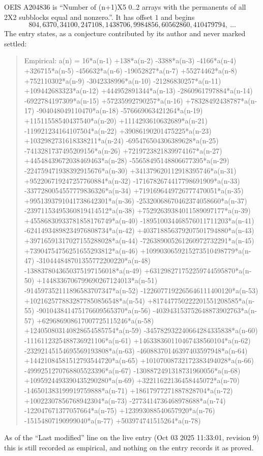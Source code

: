 \documentclass[11pt,a4paper]{article}
\theoremstyle{plain}
\theoremstyle{definition}
\begin{document}
OEIS A204836 is ``Number of (n+1)X5 0..2 arrays with the permanents of all 2X2 subblocks equal and nonzero.''. It has offset $1$ and begins
\[
804, 6370, 34100, 247108, 1438706, 9984856, 60562860, 410479794,\ \dots
\]
The entry states, as a conjecture contributed by its author and never marked settled:
\begin{quote}
Empirical: a(n) = 16*a(n-1) +138*a(n-2) -3388*a(n-3) -4166*a(n-4) +326715*a(n-5) -456632*a(n-6) -19052827*a(n-7) +55274462*a(n-8) +752110302*a(n-9) -3042338996*a(n-10) -21286830257*a(n-11) +109442683323*a(n-12) +444952891344*a(n-13) -2860961797884*a(n-14) -6922784197309*a(n-15) +57235992790257*a(n-16) +78328492438787*a(n-17) -904048049110470*a(n-18) -576669063421264*a(n-19) +11511558540437540*a(n-20) +1114293610632689*a(n-21) -119921234164107504*a(n-22) +39086190201475225*a(n-23) +1032982731618338211*a(n-24) -695476504306389628*a(n-25) -7413281737495209156*a(n-26) +7219723821839974167*a(n-27) +44548439672038469463*a(n-28) -55658495148806677395*a(n-29) -224759471938392915676*a(n-30) +341379620112918395746*a(n-31) +952206719247257760884*a(n-32) -1716782674417798691909*a(n-33) -3377280054557779836326*a(n-34) +7191696449726777470051*a(n-35) +9951393791041738642301*a(n-36) -25320068670462374058660*a(n-37) -23971153495360819414512*a(n-38) +75292639384011589097177*a(n-39) +45586830933781858176749*a(n-40) -189510034468576011711203*a(n-41) -62414934898234976808734*a(n-42) +403718856379207501794880*a(n-43) +39716591317027155288028*a(n-44) -726389005261260972732291*a(n-45) +73904754756251655293812*a(n-46) +1099030659215273510498779*a(n-47) -310444848701355772200220*a(n-48) -1388378043650375197156018*a(n-49) +631298271752259744595870*a(n-50) +1448336706799690267124013*a(n-51) -914597352111896583707347*a(n-52) -1226077192265646111400120*a(n-53) +1021625778832877850856548*a(n-54) +817447750222201551208585*a(n-55) -901043841475176609565370*a(n-56) -403943153752648873902763*a(n-57) +629686908617007725115246*a(n-58) +124050803140828654585754*a(n-59) -345782932240664284335838*a(n-60) -1116112325488736921106*a(n-61) +146338360110467438560104*a(n-62) -23292145154695569193808*a(n-63) -46088370146397403597948*a(n-64) +14421084581512793544720*a(n-65) +10107008732172383494028*a(n-66) -4999251270768805523396*a(n-67) -1308872491318731960056*a(n-68) +1095924493390435290280*a(n-69) +32211622136458445072*a(n-70) -146501383199919759888*a(n-71) +18617977271887828704*a(n-72) +10022307856768942304*a(n-73) -2773414736468978688*a(n-74) -122047671377057664*a(n-75) +123993088540657920*a(n-76) -15154807190999040*a(n-77) +503974741515264*a(n-78)
\end{quote}
As of the ``Last modified'' line on the live entry (Oct 03 2025 11:33:01, revision 9) this is still
recorded as empirical, and nothing on the entry records it as proved.
\end{document}
